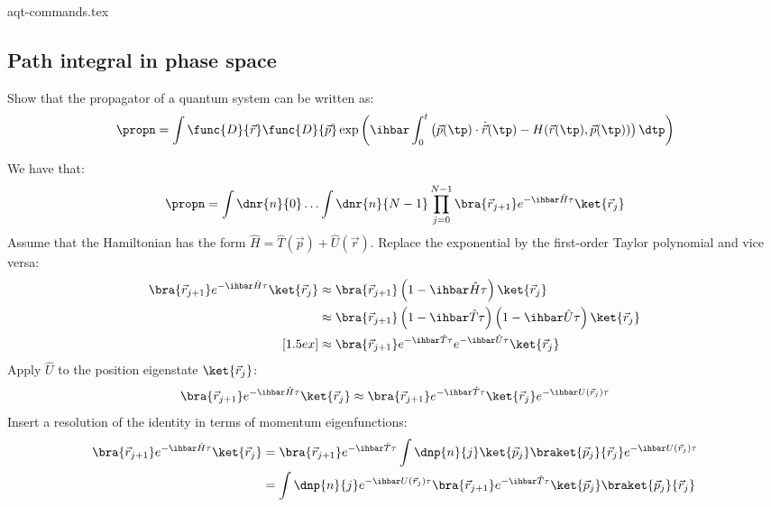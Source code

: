 
{aqt-commands.tex}
\subsection{Path integral in phase space}

Show that the propagator of a quantum system can be written as:
\begin{equation}
  \label{result}
  \propn = \int\func{D}{\vec{r}}\func{D}{\vec{p}}\exp\left(
  \ihbar\int_{0}^{t}\left(
  \vec{p}(\tp) \cdot \dot{\vec{r}}(\tp) - H(\vec{r}(\tp), \vec{p}(\tp))
  \right)\dtp
  \right)
\end{equation}

We have that:
\begin{equation}
  \label{start}
  \propn = \int\dnr{n}{0}\ldots\int\dnr{n}{N - 1}
  \prod_{j = 0}^{N - 1} \bra{\vec{r}_{j + 1}} e^{-\ihbar \hat{H}\tau} \ket{\vec{r}_j}
\end{equation}
Assume that the Hamiltonian has the form $\hat{H} = \hat{T}(\vec{p}) +
  \hat{U}(\vec{r})$.
Replace the exponential by the first-order Taylor polynomial and vice versa:
\begin{align*}
  \bra{\vec{r}_{j + 1}}
  e^{-\ihbar\hat{H}\tau}
  \ket{\vec{r}_j}
   & \approx
  \bra{\vec{r}_{j + 1}}
  \left(1 - \ihbar\hat{H}\tau\right)
  \ket{\vec{r}_j}
  \\
   & \approx
  \bra{\vec{r}_{j + 1}}
  \left(1 - \ihbar\hat{T}\tau\right)
  \left(1 - \ihbar\hat{U}\tau\right)
  \ket{\vec{r}_j}
  \\
  [1.5ex]
   & \approx
  \bra{\vec{r}_{j + 1}}
  e^{-\ihbar \hat{T}\tau} e^{-\ihbar \hat{U}\tau}
  \ket{\vec{r}_j}
\end{align*}
Apply $\hat{U}$ to the position eigenstate $\ket{\vec{r}_j}$:
\begin{equation*}
  \bra{\vec{r}_{j + 1}}
  e^{-\ihbar\hat{H}\tau}
  \ket{\vec{r}_j}
  \approx \bra{\vec{r}_{j + 1}}
  e^{-\ihbar \hat{T}\tau}
  \ket{\vec{r}_j}
  e^{-\ihbar U(\vec{r}_j)\tau}
\end{equation*}
Insert a resolution of the identity in terms of momentum eigenfunctions:
\begin{align*}
  \bra{\vec{r}_{j + 1}}
  e^{-\ihbar \hat{H}\tau}
  \ket{\vec{r}_j}
   & =
  \bra{\vec{r}_{j + 1}}
  e^{-\ihbar \hat{T}\tau}
  \int\dnp{n}{j}
  \ket{\vec{p}_j}
  \braket{\vec{p}_j}{\vec{r}_j}
  e^{-\ihbar U(\vec{r}_j)\tau}
  \\
   & =
  \int\dnp{n}{j}
  e^{-\ihbar U(\vec{r}_j)\tau}
  \bra{\vec{r}_{j + 1}}
  e^{-\ihbar \hat{T}\tau}
  \ket{\vec{p}_j}
  \braket{\vec{p}_j}{\vec{r}_j}
\end{align*}
